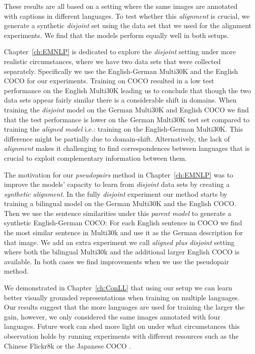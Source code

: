 These results are all based on a setting where the same images are annotated with captions 
 in different languages. To test whether this \emph{alignment} is crucial, we generate
 a synthetic \emph{disjoint} set using the data set that we used for the alignment experiments. We find
 that the models perform equally well in both setups.

Chapter~\ref{ch:EMNLP} is dedicated to explore the \emph{disjoint} setting under more realistic 
circumstances, where we have two data sets that were collected separately. 
Specifically we use the English-German Multi30K and the English COCO for our experiments.
Training on COCO resulted in a low test performance on the English Multi30K leading us to  conclude that 
though the two data sets appear fairly similar there is a considerable shift in domains. When training
the \emph{disjoint} model on the German Multi30K and English COCO we find that the test performance
is lower on the German Multi30K test set compared to training the \emph{aligned model} i.e.: training
on the English-German Multi30K. This difference might be partially due to domain-shift. Alternatively,
the lack of \emph{alignment} makes it challenging to find correspondences between languages that
is crucial to exploit complementary information between them.

The motivation for our \emph{pseudopairs} method in Chapter~\ref{ch:EMNLP} 
was to improve the models' capacity to learn from \emph{disjoint} data sets by 
creating a \emph{synthetic alignment}. In the fully \emph{disjoint} experiment our method
starts by training a bilingual model on the German Multi30K and the English COCO. Then we 
use the sentence similarities under this \emph{parent model} to generate a synthetic 
English-German COCO: For each English sentence in COCO we find the most similar sentence in Multi30k
and use it as the German description for that image. We add an extra experiment we call \emph{aligned
plus disjoint} setting where both the bilingual Multi30k and the additional larger English COCO is available.
In both cases we find improvements when we use the pseudopair method.

We demonstrated in Chapter~\ref{ch:ConLL} that using our setup we can learn better 
visually grounded representations when training on multiple languages. Our results suggest that the
more languages are used for training the larger the gain, however, we only considered the same images annotated with 
four languages. Future work can shed more light on under what circumstances this observation holds
by running experiments with different resources such as the Chinese Flickr8k \citep{li2016adding}
or the Japanese COCO \citep{P16-1168}. 

